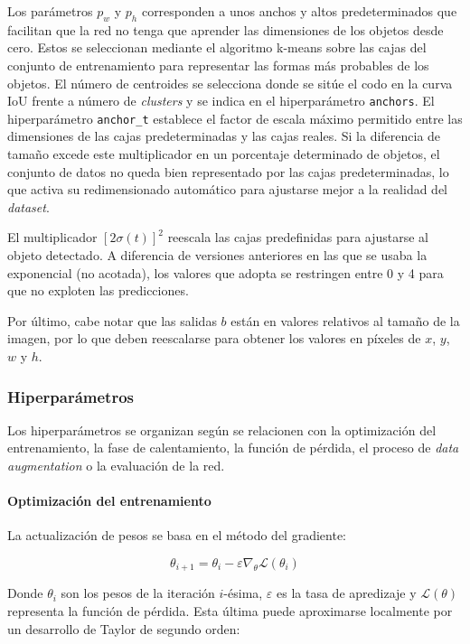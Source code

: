 \documentclass{article}
\begin{document}
	Los parámetros $p_w$ y $p_h$ corresponden a unos anchos y altos predeterminados que facilitan que la red no tenga que aprender las dimensiones de los objetos desde cero. Estos se seleccionan mediante el algoritmo k-means sobre las cajas del conjunto de entrenamiento para representar las formas más probables de los objetos. El número de centroides se selecciona donde se sitúe el codo en la curva IoU frente a número de \textit{clusters}\cite{redmon2016yolo9000betterfasterstronger} y se indica en el hiperparámetro \texttt{anchors}. El hiperparámetro \texttt{anchor\_t} establece el factor de escala máximo permitido entre las dimensiones de las cajas predeterminadas y las cajas reales. Si la diferencia de tamaño excede este multiplicador en un porcentaje determinado de objetos, el conjunto de datos no queda bien representado por las cajas predeterminadas, lo que activa su redimensionado automático para ajustarse mejor a la realidad del \textit{dataset}.
	
	El multiplicador $[2 \sigma(t)]^2$ reescala las cajas predefinidas para ajustarse al objeto detectado. A diferencia de versiones anteriores en las que se usaba la exponencial (no acotada), los valores que adopta se restringen entre 0 y 4 para que no exploten las predicciones.
	
	Por último, cabe notar que las salidas $b$ están en valores relativos al tamaño de la imagen, por lo que deben reescalarse para obtener los valores en píxeles de $x$, $y$, $w$ y $h$.
	
	\subsubsection{Hiperparámetros}
	Los hiperparámetros se organizan según se relacionen con la optimización del entrenamiento, la fase de calentamiento, la función de pérdida, el proceso de \textit{data augmentation} o la evaluación de la red.
	
	\paragraph*{Optimización del entrenamiento}$$ $$		
	La actualización de pesos se basa en el método del gradiente:
	
	\begin{equation}
		\theta_{i+1} = \theta_i - \varepsilon \nabla_{\theta} \mathcal{L}(\theta_i)
	\end{equation}
	
	Donde $\theta_i$ son los pesos de la iteración $i$-ésima, $\varepsilon$ es la tasa de apredizaje y $\mathcal{L}(\theta)$ representa la función de pérdida. Esta última puede aproximarse localmente por un desarrollo de Taylor de segundo orden:
	
\end{document}
